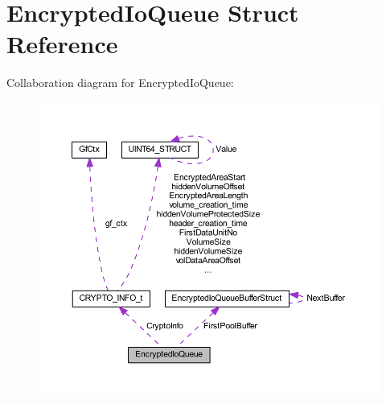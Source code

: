 \hypertarget{struct_encrypted_io_queue}{}\section{Encrypted\+Io\+Queue Struct Reference}
\label{struct_encrypted_io_queue}


Collaboration diagram for Encrypted\+Io\+Queue\+:
\nopagebreak
\begin{figure}[H]
\begin{center}
\leavevmode
\includegraphics[width=350pt]{struct_encrypted_io_queue__coll__graph}
\end{center}
\end{figure}
